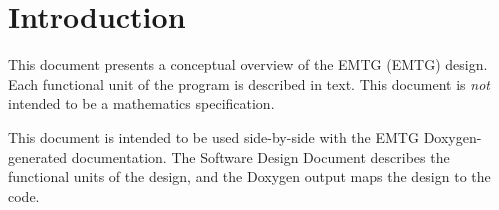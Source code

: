 \chapter{Introduction}
\label{chap:introduction}

This document presents a conceptual overview of the \acl{EMTG} (\acs{EMTG}) design. Each functional unit of the program is described in text. This document is \textit{not} intended to be a mathematics specification.

This document is intended to be used side-by-side with the \ac{EMTG} Doxygen-generated documentation. The Software Design Document describes the functional units of the design, and the Doxygen output maps the design to the code.

\endinput